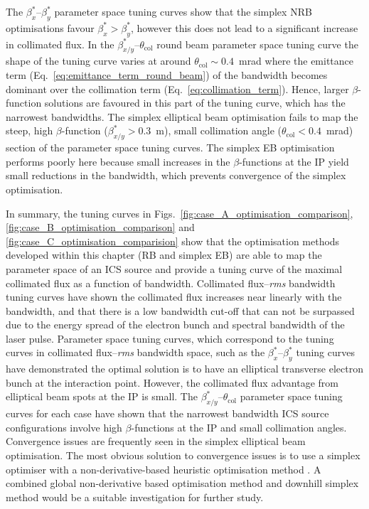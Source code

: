 \documentclass[../main.tex]{subfiles}
\begin{document}
The $\beta_{x}^{*}$--$\beta_{y}^{*}$ parameter space tuning curves show that the simplex NRB optimisations favour $\beta_{x}^{*} > \beta_{y}^{*}$, however this does not lead to a significant increase in collimated flux. In the $\beta_{x/y}^{*}$--$\theta_{\mathrm{col}}$ round beam parameter space tuning curve the shape of the tuning curve varies at around $\theta_{\mathrm{col}} \sim 0.4$~\si{\milli\radian} where the emittance term (Eq.~\ref{eq:emittance_term_round_beam}) of the bandwidth becomes dominant over the collimation term (Eq.~\ref{eq:collimation_term}). Hence, larger $\beta$-function solutions are favoured in this part of the tuning curve, which has the narrowest bandwidths. The simplex elliptical beam optimisation fails to map the steep, high $\beta$-function ($\beta_{x/y}^{*} > 0.3$~\si{\meter}), small collimation angle ($\theta_{\mathrm{col}} < 0.4$~\si{\milli\radian}) section of the parameter space tuning curves. The simplex EB optimisation performs poorly here because small increases in the $\beta$-functions at the IP yield small reductions in the bandwidth, which prevents convergence of the simplex optimisation. 

In summary, the tuning curves in Figs.~\ref{fig:case_A_optimisation_comparison}, \ref{fig:case_B_optimisation_comparison} and \ref{fig:case_C_optimisation_comparision} show that the optimisation methods developed within this chapter (RB and simplex EB) are able to map the parameter space of an ICS source and provide a tuning curve of the maximal collimated flux as a function of bandwidth. Collimated flux--\textit{rms} bandwidth tuning curves have shown the collimated flux increases near linearly with the  bandwidth, and that there is a low bandwidth cut-off that can not be surpassed due to the energy spread of the electron bunch and spectral bandwidth of the laser pulse. Parameter space tuning curves, which correspond to the tuning curves in collimated flux--\textit{rms} bandwidth space, such as the $\beta_{x}^{*}$--$\beta_{y}^{*}$ tuning curves have demonstrated the optimal solution is to have an elliptical transverse electron bunch at the interaction point. However, the collimated flux advantage from elliptical beam spots at the IP is small. The $\beta_{x/y}^{*}$--$\theta_{\mathrm{col}}$ parameter space tuning curves for each case have shown that the narrowest bandwidth ICS source configurations involve high $\beta$-functions at the IP and small collimation angles. Convergence issues are frequently seen in the simplex elliptical beam optimisation. The most obvious solution to convergence issues is to use a simplex optimiser with a non-derivative-based heuristic optimisation method \cite{jones2016design}. A combined global non-derivative based optimisation method and downhill simplex method would be a suitable investigation for further study.
\end{document}
